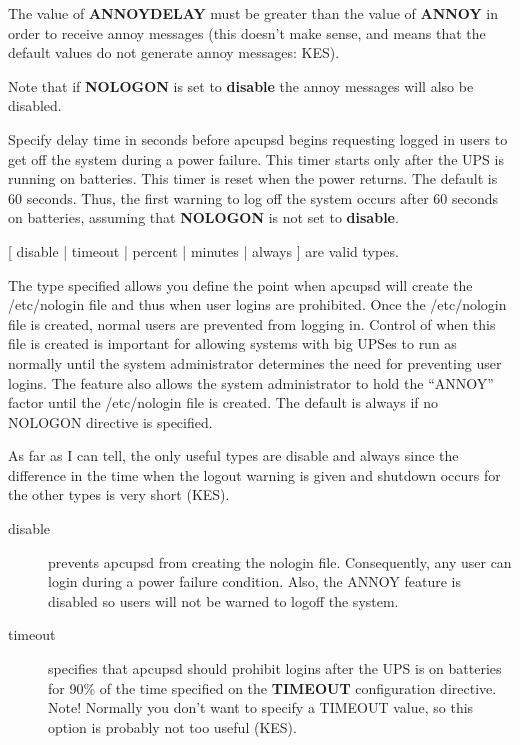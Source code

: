 {{{{{{{{{\begin{description}
The value of {\bf ANNOYDELAY} must be greater than the value of {\bf ANNOY} in
order to receive annoy messages (this doesn't make sense, and means that the
default values do not generate annoy messages: KES).  

Note that if {\bf NOLOGON} is set to {\bf disable} the annoy messages will
also be disabled.  

\item [ANNOYDELAY \lt{}time in seconds\gt{}]
   Specify delay time in seconds before apcupsd begins requesting logged in users
to get off the system during a power failure. This timer starts only after the
UPS is running on batteries. This timer is reset when the power returns. The
default is 60 seconds. Thus, the first warning to log off the system occurs
after 60 seconds on batteries, assuming that {\bf NOLOGON} is not set to {\bf
disable}.  

\item [NOLOGON \lt{}specifies when apcupsd should prevent user
   logins\gt{}]
[ disable | timeout | percent | minutes | always ] are valid types.  

The type specified allows you define the point when apcupsd will create the
/etc/nologin file and thus when user logins are prohibited. Once the
/etc/nologin file is created, normal users are prevented from logging in.
Control of when this file is created is important for allowing systems with
big UPSes to run as normally until the system administrator determines the
need for preventing user logins. The feature also allows the system
administrator to hold the ``ANNOY'' factor until the /etc/nologin file is
created. The default is always if no NOLOGON directive is specified.  

As far as I can tell, the only useful types are disable and always since the
difference in the time when the logout warning is given and shutdown occurs
for the other types is very short (KES).  

\begin{description}

\item [disable]
   prevents apcupsd from creating the nologin file.  Consequently, any user can
login during a power failure condition.  Also, the ANNOY feature is disabled
so users will not be warned to logoff the system.  

\item [timeout]
   specifies that apcupsd should prohibit logins after the UPS is on batteries
for 90\% of the time specified on the {\bf TIMEOUT} configuration directive.
Note! Normally you don't want to specify a TIMEOUT value, so this option is
probably not too useful (KES).  


\end{description}
\end{description}}}}}}}}}}
